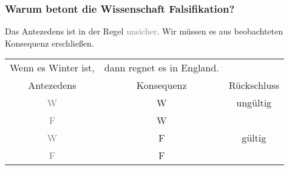 \documentclass{beamer}
\begin{document}
\begin{frame}
  \frametitle{Warum betont die Wissenschaft Falsifikation?}
  Das Antezedens ist in der Regel \textcolor{gray}{unsicher}.
  Wir müssen es aus beobachteten Konsequenz erschließen.
  \begin{table}
    \centering
    \begin{tabular}{*{3}{c}}
      Wenn es Winter ist, & dann regnet es in England. \\
      Antezedens & Konsequenz & Rückschluss \\ \hline
      \textcolor{gray}{W} & W & ungültig\\
      \textcolor{gray}{F} & W & \\ \hline 
      \textcolor{gray}{W} & F & gültig\\
      \textcolor{gray}{F} & F & \\
    \end{tabular}
  \end{table}
\end{frame}
\end{document}

